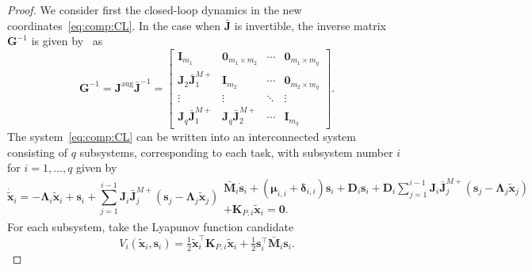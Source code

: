 \documentclass[../main.tex]{subfiles}
\begin{document}
\begin{proof}
    We consider first the closed-loop dynamics in the new coordinates~\eqref{eq:comp:CL}. In the case when $\bar{\bm{J}}$ is invertible, the inverse matrix $\bm{G}^{-1}$ is given by~\cite{Garofalo2020} as
    \begin{equation}
        \bm{G}^{-1} = \bm{J}^{\textrm{aug}} \bar{\bm{J}}^{-1} = \begin{bmatrix}
            \bm{I}_{m_1} & \bm{0}_{m_1 \times m_2} & \cdots & \bm{0}_{m_1 \times m_q}\\
            \bm{J}_2 \bar{\bm{J}}^{M+}_1 & \bm{I}_{m_2} & \cdots & \bm{0}_{m_2 \times m_q}\\
            \vdots & \vdots & \ddots & \vdots \\
            \bm{J}_q \bar{\bm{J}}^{M+}_1 & \bm{J}_q \bar{\bm{J}}^{M+}_2 & \cdots & \bm{I}_{m_q}
        \end{bmatrix} .
    \end{equation}
    The system~\eqref{eq:comp:CL} can be written into an interconnected system consisting of $q$ subsystems, corresponding to each task, with subsystem number $i$ for $i=1,\ldots,q$ given by
    \begin{subequations} \label{interconnection}
        \begin{equation}
            \dot{\tilde{\bm{x}}}_i = -\bm{\Lambda}_i \tilde{\bm{x}}_i + \bm{s}_i + \sum_{j=1}^{i-1} \bm{J}_i \bar{\bm{J}}_j^{M+} \left( \bm{s}_j - \bm{\Lambda}_j \tilde{\bm{x}}_j \right) \label{eq:comp:xitilde_dot}
        \end{equation}
        \begin{multline}
            \bar{\bm{M}}_i \dot{\bm{s}}_i + (\bm{\mu}_{i,i} + \bm{\delta}_{i,i}) \bm{s}_i + \bm{D}_i \bm{s}_i + \bm{D}_i \sum_{j=1}^{i-1} \bm{J}_i \bar{\bm{J}}_j^{M+} \left( \bm{s}_j - \bm{\Lambda}_j \tilde{\bm{x}}_j \right) \\
            + \bm{K}_{P,i} \tilde{\bm{x}}_i = \bm{0} .
        \end{multline}
    \end{subequations}
    For each subsystem, take the Lyapunov function candidate
    \begin{equation}\label{eq:comp:Vi}
        V_i(\tilde{\bm{x}}_i,\bm{s}_i) = \tfrac{1}{2} \tilde{\bm{x}}_i^\top \bm{K}_{P,i} \tilde{\bm{x}}_i + \tfrac{1}{2} \bm{s}_i^\top\bar{\bm{M}}_i \bm{s}_i .
    \end{equation}

\end{proof}
\end{document}
